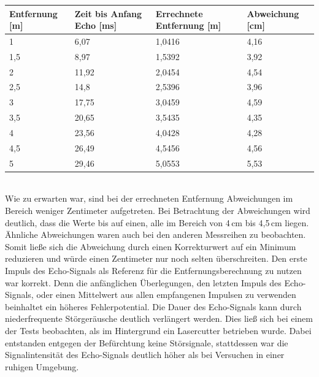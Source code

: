 \begin{minipage}{1\textwidth}
\begin{tabularx}{\textwidth}{|p{}|p{}|p{}|X|}
\hline
Entfernung [m]& Zeit bis Anfang Echo [ms]  & Errechnete Entfernung [m] & Abweichung [cm]\\
\hline
1 & 6,07 & 1,0416 & 4,16\\
\hline
1,5 & 8,97 & 1,5392 & 3,92\\
\hline
2 & 11,92 & 2,0454 & 4,54\\
\hline
2,5 & 14,8 & 2,5396 & 3,96\\
\hline
3 & 17,75 & 3,0459 & 4,59\\
\hline
3,5 & 20,65 & 3,5435 & 4,35\\
\hline
4 & 23,56 & 4,0428 & 4,28\\
\hline
4,5 & 26,49 & 4,5456 & 4,56\\
\hline
5 & 29,46 & 5,0553 & 5,53\\
\hline
\end{tabularx}

\label{tab:Entfernungsmessung}
\end{minipage}\\


Wie zu erwarten war, sind bei der errechneten Entfernung Abweichungen im Bereich weniger Zentimeter aufgetreten. Bei Betrachtung der Abweichungen wird deutlich, dass die Werte bis auf einen, alle im Bereich von 4\,cm bis 4,5\,cm liegen. Ähnliche Abweichungen waren auch bei den anderen Messreihen zu beobachten. Somit ließe sich die Abweichung durch einen Korrekturwert auf ein Minimum reduzieren und würde einen Zentimeter nur noch selten überschreiten. Den erste Impuls des Echo-Signals als Referenz für die Entfernungsberechnung zu nutzen war korrekt. Denn die anfänglichen Überlegungen, den letzten Impuls des Echo-Signals, oder einen Mittelwert aus allen empfangenen Impulsen zu verwenden beinhaltet ein höheres Fehlerpotential. Die Dauer des Echo-Signals kann durch niederfrequente Störgeräusche deutlich verlängert werden. Dies ließ sich bei einem der Tests beobachten, als im Hintergrund ein Lasercutter betrieben wurde. Dabei entstanden entgegen der Befürchtung keine Störsignale, stattdessen war die Signalintensität des Echo-Signals deutlich höher als bei Versuchen in einer ruhigen Umgebung. 












